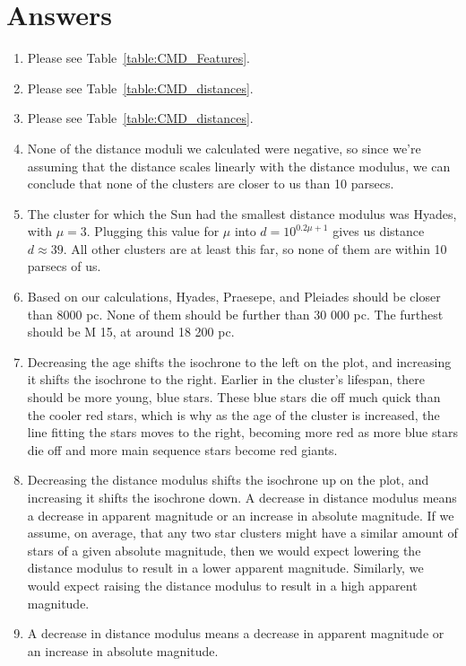 \documentclass[11pt]{article}
\begin{document}
\section{Answers}
\begin{enumerate}[label={\textbf{\emph{(\arabic*)}}}]
	\item %
Please see Table~\ref{table:CMD_Features}.
	\item %
Please see Table~\ref{table:CMD_distances}.
	\item %
Please see Table~\ref{table:CMD_distances}.
	\item %
None of the distance moduli we calculated were negative, so since we're assuming that the distance scales linearly with the distance modulus, we can conclude that none of the clusters are closer to us than 10 parsecs.
	\item %
The cluster for which the Sun had the smallest distance modulus was Hyades, with $\mu = 3$.
Plugging this value for $\mu$ into $d = 10^{0.2\mu + 1}$ gives us distance $d \approx 39$.
All other clusters are at least this far, so none of them are within 10 parsecs of us.
	\item %
Based on our calculations, Hyades, Praesepe, and Pleiades should be closer than 8000 pc.
None of them should be further than 30 000 pc.
The furthest should be M 15, at around 18 200 pc.
	\item %
Decreasing the age shifts the isochrone to the left on the plot, and increasing it shifts the isochrone to the right.
Earlier in the cluster's lifespan, there should be more young, blue stars.
These blue stars die off much quick than the cooler red stars, which is why as the age of the cluster is increased, the line fitting the stars moves to the right, becoming more red as more blue stars die off and more main sequence stars become red giants.
	\item %
Decreasing the distance modulus shifts the isochrone up on the plot, and increasing it shifts the isochrone down.
A decrease in distance modulus means a decrease in apparent magnitude or an increase in absolute magnitude.
If we assume, on average, that any two star clusters might have a similar amount of stars of a given absolute magnitude, then we would expect lowering the distance modulus to result in a lower apparent magnitude.
Similarly, we would expect raising the distance modulus to result in a high apparent magnitude.
	\item %
A decrease in distance modulus means a decrease in apparent magnitude or an increase in absolute magnitude.

\end{enumerate}
\end{document}
